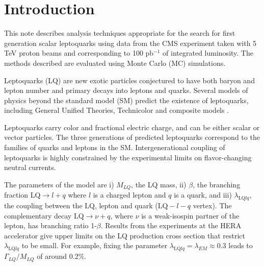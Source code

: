 \setcounter{page}{2}%

\section{Introduction}
This note describes analysis techniques 
appropriate for the
search for first generation scalar leptoquarks 
using data from the CMS experiment taken with 5 TeV proton beams and 
corresponding to 100 pb$^{-1}$ of integrated luminosity.
The methods described are evaluated using 
Monte Carlo (MC) simulations.

%
Leptoquarks (LQ) are new exotic particles conjectured to have both baryon and lepton number 
and primary decays into leptons and quarks. 
Several models of physics beyond the standard model (SM) predict the existence of leptoquarks,
including General Unified Theories, Technicolor and composite models \cite{theories}.  

Leptoquarks carry color and fractional electric charge, 
and can be either scalar or vector particles. The three generations of predicted leptoquarks 
correspond to the families of quarks and leptons in the SM.  Intergenerational coupling of 
leptoquarks is highly constrained by the experimental limits on flavor-changing neutral currents. 




The parameters of the model are i) $M_{LQ}$, the LQ mass, ii) $\beta$, 
the branching fraction 
$\mbox{LQ} \rightarrow l + q$
where $l$ is a charged lepton and $q$ is a quark, and
iii) $\lambda_{\mbox{LQ}lq}$, the coupling between the LQ, lepton and 
quark ($\mbox{LQ}-l-q$ vertex). 
The complementary decay $\mbox{LQ} \rightarrow \nu + q$, 
where $\nu$ is a weak-isospin partner of the lepton,
has branching ratio 1-$\beta$.
Results from the experiments at the HERA accelerator
give upper limits on the LQ production cross section that restrict  
$\lambda_{\mbox{LQ}lq}$ to be small\cite{hera}. 
For example, fixing the parameter 
$\lambda_{\mbox{LQ}lq} = \lambda_{EM} \approx 0.3$ leads to 
$\Gamma_{LQ}/M_{LQ}$ of around 0.2\%. 



